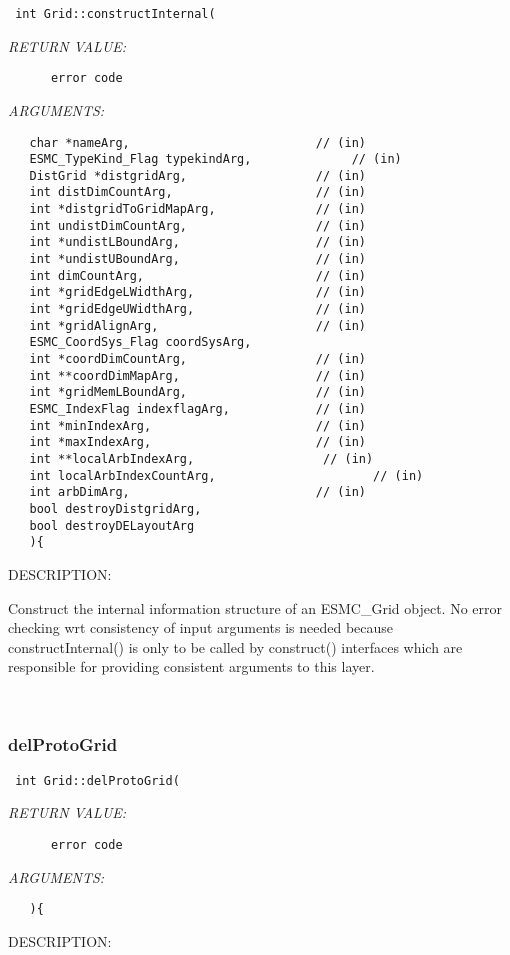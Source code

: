   
\begin{verbatim} int Grid::constructInternal(\end{verbatim}{\em RETURN VALUE:}
\begin{verbatim}      error code\end{verbatim}{\em ARGUMENTS:}
\begin{verbatim}   char *nameArg,                          // (in)
   ESMC_TypeKind_Flag typekindArg,              // (in)
   DistGrid *distgridArg,                  // (in)
   int distDimCountArg,                    // (in)
   int *distgridToGridMapArg,              // (in)
   int undistDimCountArg,                  // (in)
   int *undistLBoundArg,                   // (in)
   int *undistUBoundArg,                   // (in)
   int dimCountArg,                        // (in)
   int *gridEdgeLWidthArg,                 // (in)
   int *gridEdgeUWidthArg,                 // (in)
   int *gridAlignArg,                      // (in)
   ESMC_CoordSys_Flag coordSysArg, 
   int *coordDimCountArg,                  // (in)
   int **coordDimMapArg,                   // (in)
   int *gridMemLBoundArg,                  // (in)
   ESMC_IndexFlag indexflagArg,            // (in)
   int *minIndexArg,                       // (in)
   int *maxIndexArg,                       // (in)
   int **localArbIndexArg,                  // (in)
   int localArbIndexCountArg,                      // (in)
   int arbDimArg,                          // (in)
   bool destroyDistgridArg, 
   bool destroyDELayoutArg 
   ){\end{verbatim}
{\sf DESCRIPTION:\\ }


     Construct the internal information structure of an ESMC\_Grid object.
    No error checking wrt consistency of input arguments is needed because
    constructInternal() is only to be called by construct() interfaces which
    are responsible for providing consistent arguments to this layer.
   
 
\mbox{}\hrulefill\
 
\subsubsection [delProtoGrid] {delProtoGrid}


  
\begin{verbatim} int Grid::delProtoGrid(\end{verbatim}{\em RETURN VALUE:}
\begin{verbatim}      error code\end{verbatim}{\em ARGUMENTS:}
\begin{verbatim}   ){\end{verbatim}
{\sf DESCRIPTION:\\ }


